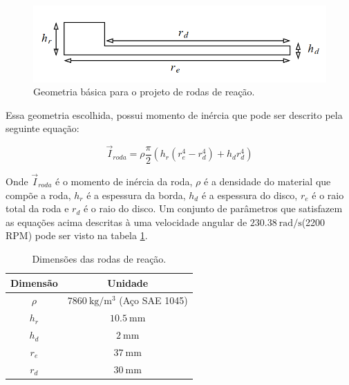 \begin{figure}[H]
  \caption{Geometria básica para o projeto de rodas de reação.}
  \begin{center}
      \includegraphics[scale=.45]{metodologia/img/roda_reacao_modelo}
  \end{center}
  \label{fig:motor_roda_desenho2}
\end{figure}

Essa geometria escolhida, possui momento de inércia que pode ser descrito pela seguinte equação:

\begin{equation}
\vec{I}_{roda} = \rho \frac{\pi}{2}(h_r(r_{e}^4-r_d^4)+h_dr_d^4) 
\end{equation}

Onde $\vec{I}_{roda}$ é o momento de inércia da roda, $\rho$ é a densidade do material que compõe a roda, $h_r$ é a espessura da borda, $h_d$ é a espessura do disco, $r_e$ é o raio total da roda e $r_d$ é o raio do disco. Um conjunto de parâmetros que satisfazem as equações acima descritas à uma velocidade angular de $\SI{230.38}{\radian\per\second}$(2200 RPM) pode ser visto na tabela \ref{tab:react}. 

\begin{table}
  \caption{Dimensões das rodas de reação.}
  \label{tab:react}
  \centering%
  \begin{minipage}{.42\textwidth}
    \begin{tabular*}{\textwidth}{cc}
      \hline
      {Dimensão} & Unidade \\ \hline
      \hline
      $\rho$  &  $\SI{7860}{\kilogram\per\cubic\metre}$ (Aço SAE 1045)\\ 
      $h_r$   &  $\SI{10.5}{\milli\metre}$ \\
      $h_d$   &  $\SI{2}{\milli\metre}$  \\
      $r_e$   &  $\SI{37}{\milli\metre}$  \\
      $r_d$   &  $\SI{30}{\milli\metre}$  \\ \hline
    \end{tabular*}
  \end{minipage}
\end{table}



